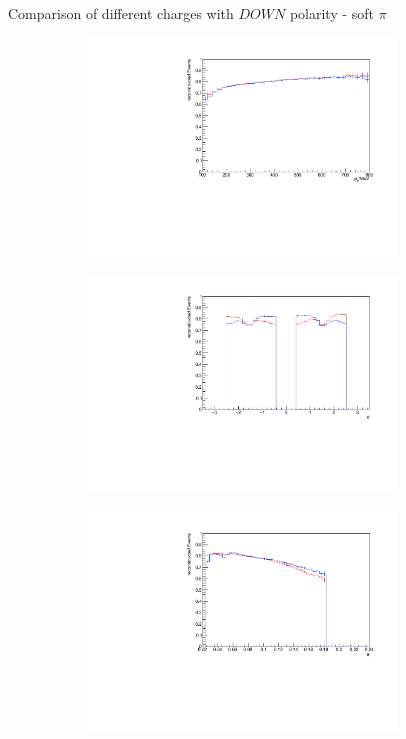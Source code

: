 \documentclass[11pt]{beamer}
\begin{document}
\begin{frame}{Comparison of different charges with $DOWN$ polarity - soft $\pi$}
\begin{figure}
\begin{subfigure}{0.45\textwidth}
\includegraphics[width=0.9\textwidth]{first/down_pdf/combined/h_pt_reco_SPi.pdf}
\end{subfigure}
\begin{subfigure}{0.45\textwidth}
\includegraphics[width=0.9\textwidth]{first/down_pdf/combined/h_phi_reco_SPi.pdf}
\end{subfigure}
\begin{subfigure}{0.45\textwidth}
\includegraphics[width=0.9\textwidth]{first/down_pdf/combined/h_theta_reco_SPi.pdf}

\end{subfigure}
\end{figure}
\end{frame}
\end{document}
